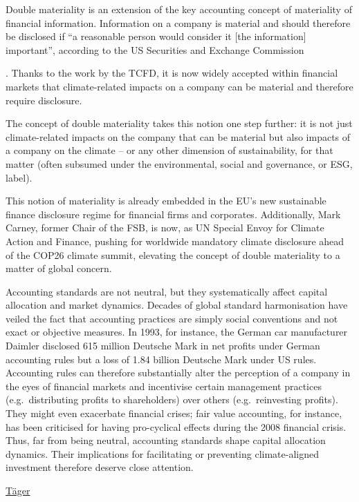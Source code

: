 \documentclass[
]{book}
\begin{document}
Double materiality is an extension of the key accounting concept of materiality of financial information. Information on a company is material and should therefore be disclosed if ``a reasonable person would consider it {[}the information{]} important'', according to the US Securities and Exchange Commission﻿

. Thanks to the work by the TCFD, it is now widely accepted within financial markets that climate-related impacts on a company can be material and therefore require disclosure.

The concept of double materiality takes this notion one step further: it is not just climate-related impacts on the company that can be material but also impacts of a company on the climate -- or any other dimension of sustainability, for that matter (often subsumed under the environmental, social and governance, or ESG, label).

This notion of materiality is already embedded in the EU's new sustainable finance disclosure regime for financial firms﻿
and corporates﻿. Additionally, Mark Carney, former Chair of the FSB, is now, as UN Special Envoy for Climate Action and Finance, pushing for worldwide mandatory climate disclosure ahead of the COP26 climate summit, elevating the concept of double materiality to a matter of global concern.

Accounting standards are not neutral, but they systematically affect capital allocation and market dynamics. Decades of global standard harmonisation have veiled the fact that accounting practices are simply social conventions and not exact or objective measures. In 1993, for instance, the German car manufacturer Daimler disclosed 615 million Deutsche Mark in net profits﻿ under German accounting rules but a loss of 1.84 billion Deutsche Mark under US rules. Accounting rules can therefore substantially alter the perception of a company in the eyes of financial markets and incentivise certain management practices (e.g.~distributing profits to shareholders) over others (e.g.~reinvesting profits). They might even exacerbate financial crises; fair value accounting, for instance, has been criticised﻿ for having pro-cyclical effects during the 2008 financial crisis. Thus, far from being neutral, accounting standards shape capital allocation dynamics. Their implications for facilitating or preventing climate-aligned investment therefore deserve close attention.

\href{https://www.lse.ac.uk/granthaminstitute/news/double-materiality-what-is-it-and-why-does-it-matter/}{Täger}
\end{document}
